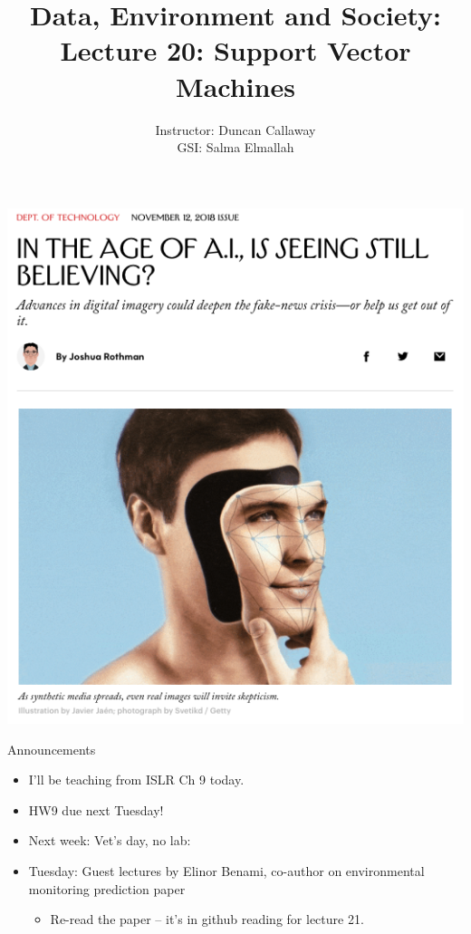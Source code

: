 \documentclass[mathserif, aspectratio=169]{beamer}
\title[Lecture 20] %
{Data, Environment and Society: \\{Lecture 20: Support Vector Machines}}
\author[ER131: Data, Environment and Society] 
{Instructor: Duncan Callaway\\
GSI: Salma Elmallah}
\institute[UC Berkeley] %
 {\small{ \bf November 7, 2019}}
\date[November 7, 2019]
\begin{document}
\frame{
  \titlepage
}

\begin{frame}{}
\includegraphics[height=\textheight]{new_yorker}
\end{frame}

\begin{frame}{Announcements}

\begin{itemize}
\item I'll be teaching from ISLR Ch 9 today.
\item HW9 due next Tuesday!
\item Next week: Vet's day, no lab: 
\item Tuesday: Guest lectures by Elinor Benami, co-author on environmental monitoring prediction paper
\begin{itemize}
	\item Re-read the paper -- it's in github reading for lecture 21.
\end{itemize}
\end{itemize}

\end{frame}
\end{document}
